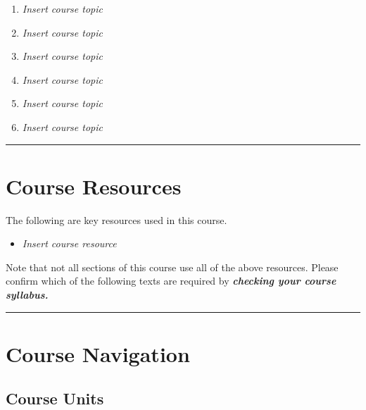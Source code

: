 \documentclass[
]{book}
\providecommand{\tightlist}{%
  \setlength{\itemsep}{0pt}\setlength{\parskip}{0pt}}
\begin{document}
\begin{enumerate}
\def\labelenumi{\arabic{enumi}.}
\tightlist
\item
  \emph{Insert course topic}
\item
  \emph{Insert course topic}
\item
  \emph{Insert course topic}
\item
  \emph{Insert course topic}
\item
  \emph{Insert course topic}
\item
  \emph{Insert course topic}
\end{enumerate}

\begin{center}\rule{0.5\linewidth}{0.5pt}\end{center}

\hypertarget{course-resources}{%
\section*{Course Resources}\label{course-resources}}

The following are key resources used in this course.

\begin{itemize}
\tightlist
\item
  \emph{Insert course resource}
\end{itemize}

\begin{caution}
Note that not all sections of this course use all of the above
resources. Please confirm which of the following texts are required by
\textbf{\emph{checking your course syllabus.}}
\end{caution}

\begin{center}\rule{0.5\linewidth}{0.5pt}\end{center}

\hypertarget{course-navigation}{%
\section*{Course Navigation}\label{course-navigation}}

\hypertarget{course-units}{%
\subsection*{Course Units}\label{course-units}}
\end{document}
